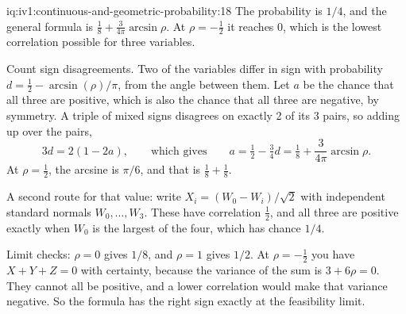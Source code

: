 \begin{solution}{iq:iv1:continuous-and-geometric-probability:18}
The probability is $1/4$, and the general formula is $\tfrac18 + \tfrac{3}{4\pi} \arcsin \rho$. At $\rho = -\tfrac12$ it reaches 0, which is the lowest correlation possible for three variables.

Count sign disagreements. Two of the variables differ in sign with probability $d = \tfrac12 - \arcsin(\rho)/\pi$, from the angle between them. Let $a$ be the chance that all three are positive, which is also the chance that all three are negative, by symmetry. A triple of mixed signs disagrees on exactly 2 of its 3 pairs, so adding up over the pairs,
\[
3d = 2(1 - 2a), \qquad\text{which gives}\qquad a = \tfrac12 - \tfrac34 d = \tfrac18 + \frac{3}{4\pi}\arcsin\rho.
\]
At $\rho = \tfrac12$, the arcsine is $\pi/6$, and that is $\tfrac18 + \tfrac18$.

A second route for that value: write $X_i = (W_0 - W_i)/\sqrt{2}$ with independent standard normals $W_0, \dots, W_3$. These have correlation $\tfrac12$, and all three are positive exactly when $W_0$ is the largest of the four, which has chance $1/4$.

Limit checks: $\rho = 0$ gives $1/8$, and $\rho = 1$ gives $1/2$. At $\rho = -\tfrac12$ you have $X + Y + Z = 0$ with certainty, because the variance of the sum is $3 + 6\rho = 0$. They cannot all be positive, and a lower correlation would make that variance negative. So the formula has the right sign exactly at the feasibility limit.

\end{solution}


